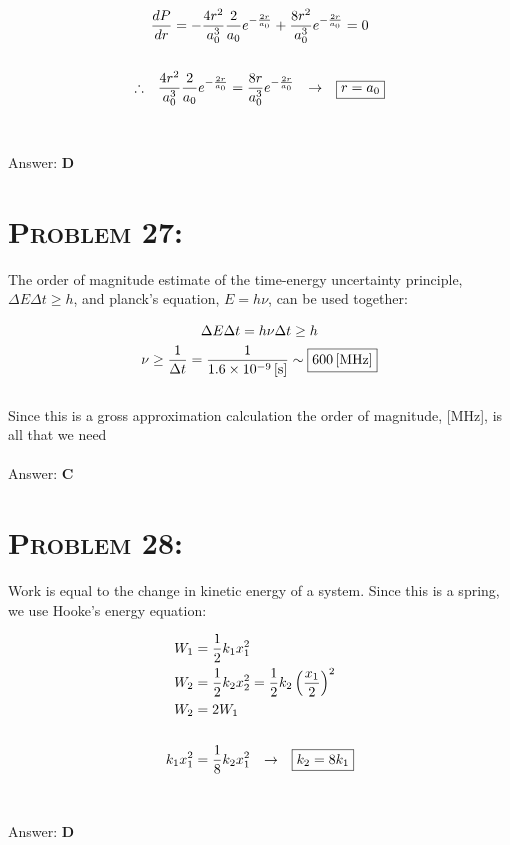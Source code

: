 \documentclass{article}
\providecommand{\e}[1]{\ensuremath{\times 10^{#1}}}
\begin{document}
\begin{gather}
\frac{dP}{dr} = -\frac{4 r^2}{a_{0}^3} \frac{2}{a_{0}} e^{-\frac{2 r}{a_{0}}} + \frac{8 r^2}{a_{0}^3} e^{-\frac{2 r}{a_{0}}} = 0\nonumber\\
\nonumber\\
\therefore \hspace{.1in} \frac{4 r^2}{a_{0}^3} \frac{2}{a_{0}} e^{-\frac{2 r}{a_{0}}} = \frac{8 r}{a_{0}^3} e^{-\frac{2 r}{a_{0}}} \hspace{.1in} \rightarrow \hspace{.1in} \boxed {r = a_{0}}\nonumber
\end{gather}
\\\\
Answer: \textbf{\textcolor{ProcessBlue}D}\\


\section{\textsc{Problem 27:}} The order of magnitude estimate  of the time-energy uncertainty principle, $\Delta E \Delta t \geq h$, and planck's equation, $E = h \nu$, can be used together:

\begin{gather}
\Delta E \Delta t = h \nu \Delta t \geq h\nonumber\\
\nu \geq \frac{1}{\Delta t} = \frac{1}{\unit[1.6\e{-9}]{[s]}} \sim \boxed{\unit[600]{[MHz]}}\nonumber
\end{gather}
\\
Since this is a gross approximation calculation the order of magnitude, [MHz], is all that we need
\\\\
Answer: \textbf{\textcolor{ProcessBlue}C}\\


\section{\textsc{Problem 28:}} Work is equal to the change in kinetic energy of a system. Since this is a spring, we use Hooke's energy equation:

\begin{align}
W_{1} &= \frac{1}{2}k_{1}x_{1}^{2}\nonumber\\
W_{2} &= \frac{1}{2}k_{2}x_{2}^{2} = \frac{1}{2}k_2 \left(\frac{x_1}{2}\right)^{2}\nonumber\\
W_{2} &= 2W_{1}\nonumber\\
\nonumber\\
k_{1}x_{1}^{2} &= \frac{1}{8}k_{2} x_{1}^{2} \hspace{.1in} \rightarrow \hspace{.1in} \boxed{k_{2} = 8k_{1}}\nonumber
\end{align}
\\\\
Answer: \textbf{\textcolor{ProcessBlue}D}\\
\end{document}
